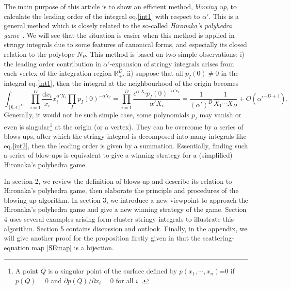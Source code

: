\documentclass[12pt]{article}
\theoremstyle{definition}
\theoremstyle{plain}
\newcommand{\dif}{\mathrm{d}} %
\begin{document}
The main purpose of this article is to show an efficient method, {\it{blowing up}}, %
to calculate the leading order of the integral eq.\eqref{int1} with respect to $\alpha'$. This is a general method which is closely related to the so-called \emph{Hironaka's polyhedra game}~\cite{}. We will see that the situation is easier when this method is applied in stringy integrals due to some features of canonical forms, and especially its closed relation to the polytope $N_{P}$. This method is based on two simple observations: i) the leading order contribution in $\alpha'$-expansion of stringy integrals arises from each vertex of the integration region $\mathbb{R}_{+}^{D}$, ii) suppose that all $p_I(0)\neq 0$ in the integral eq.\eqref{int1}, then the integral at the neighbourhood of the origin becomes 
\begin{equation}\label{int2}
	\int_{[0,\epsilon]^D}\prod_{i=1}^D\frac{\dif x_i}{x_i}x_i^{\alpha' X_i} \prod_{I}p_{I}(0)^{-\alpha' c_{I}}
	=\prod_{i=1}^D\frac{\epsilon^{\alpha' X_i}p_{I}(0)^{-\alpha' c_{I}}}{\alpha' X_i}
	= \frac{1}{(\alpha')^D}\frac{1}{X_1\cdots X_D}+O(\alpha'^{-D+1}).
\end{equation}
Generally, it would not be such simple case, some polynomials $p_{I}$ may vanish or even is singular\footnote{A point $Q$ is a singular point of the surface defined by $p(x_{1},\cdots,x_{n})$=0 if $p(Q)=0$ and $\partial p(Q)/\partial x_{i} =0$ for all $i$~\cite{}. } at the origin (or a vertex).
They can be overcome by a series of blows-ups, after which the stringy integral is decomposed into many integrals like eq.\eqref{int2}, then the leading order is given by a summation. %
Essentially, finding such a series of blow-ups is equivalent to give a winning strategy for a (simplified) Hironaka's polyhedra game.


In section 2, we review the definition of blows-up and describe its relation to Hironaka's polyhedra game, then elaborate the principle and procedures of the blowing up algorithm. 
In section 3, we introduce a new viewpoint to approach the Hironaka's polyhedra game
and give a new winning strategy of the game.
Section 4 uses several examples arising form cluster stringy integrals to illustrate this algorithm.
Section 5 contains discussion and outlook. Finally, in the appendix, we will give another proof for the proposition firstly given in \cite{Arkani-Hamed:2017tmz} that the scattering-equation map \eqref{SEmap} is a bijection. 
\end{document}
